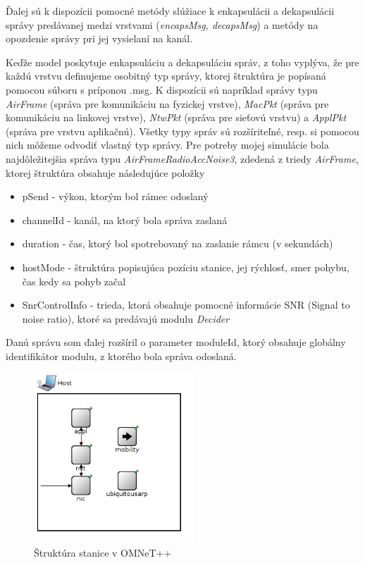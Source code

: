 \documentclass[11pt,twoside,a4paper]{book}
\begin{document}
Ďalej sú k dispozícii pomocné metódy slúžiace k enkapsulácii a dekapsulácii správy predávanej medzi vrstvami (\textit{encapsMsg, decapsMsg}) a metódy na opozdenie správy pri jej vysielaní na kanál.

Keďže model poskytuje enkapsuláciu a dekapsuláciu správ, z toho vyplýva, že pre každú vrstvu definujeme osobitný typ správy, ktorej štruktúra je popísaná pomocou súboru s príponou .msg. K dispozícii sú napríklad správy typu \textit{AirFrame} (správa pre komunikáciu na fyzickej vrstve), \textit{MacPkt} (správa pre komunikáciu na linkovej vrstve), \textit{NtwPkt} (správa pre sieťovú vrstvu) a \textit{ApplPkt} (správa pre vrstvu aplikačnú). Všetky typy správ sú rozšíriteľné, resp. si pomocou nich môžeme odvodiť vlastný typ správy. Pre potreby mojej simulácie bola najdôležitejšia správa typu \textit{AirFrameRadioAccNoise3}, zdedená z triedy \textit{AirFrame}, ktorej štruktúra obsahuje následujúce položky

\begin{itemize}
 \item pSend - výkon, ktorým bol rámec odoslaný
 \item channelId - kanál, na ktorý bola správa zaslaná
 \item duration - čas, ktorý bol spotrebovaný na zaslanie rámcu (v sekundách)
 \item hostMode - štruktúra popisujúca pozíciu stanice, jej rýchlosť, smer pohybu, čas kedy sa pohyb začal
 \item SnrControlInfo - trieda, ktorá obsahuje pomocné informácie SNR (Signal to noise ratio), ktoré sa predávajú modulu \textit{Decider}
\end{itemize}


Danú správu som ďalej rozšíril o parameter moduleId, ktorý obsahuje globálny identifikátor modulu, z ktorého bola správa odoslaná.

\begin{figure}[h]
 \centering
 \includegraphics[width=6cm]{./figures/host.png}
 \caption{Štruktúra stanice v OMNeT++}
 \label{fig:Host}
\end{figure}
\end{document}
